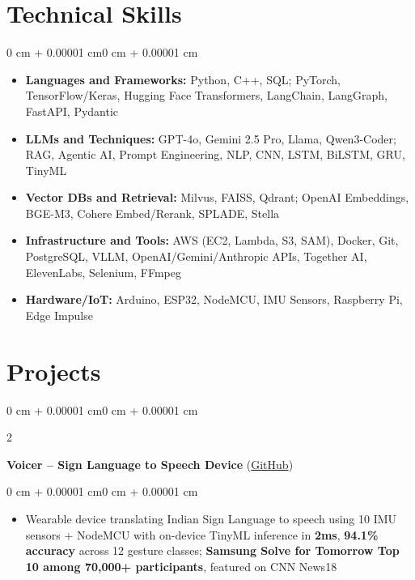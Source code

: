 \documentclass[10pt, letterpaper]{article}
\newenvironment{highlights}{
    \begin{itemize}[
        topsep=0.01 cm,
        parsep=0.01 cm,
        partopsep=0pt,
        itemsep=0pt,
        leftmargin=0 cm + 10pt
    ]
}{
    \end{itemize}
}
\newenvironment{highlightsforbulletentries}{
    \begin{itemize}[
        topsep=0.01 cm,
        parsep=0.01 cm,
        partopsep=0pt,
        itemsep=0pt,
        leftmargin=10pt
    ]
}{
    \end{itemize}
}
\newenvironment{onecolentry}{
    \begin{adjustwidth}{0 cm + 0.00001 cm}{0 cm + 0.00001 cm}
}{
    \end{adjustwidth}
}
\newenvironment{twocolentry}[2][]{
    \onecolentry
    \def\secondColumn{#2}
    \setcolumnwidth{\fill, 5.5 cm}
    \begin{paracol}{2}
}{
    \switchcolumn \raggedleft \secondColumn
    \end{paracol}
    \endonecolentry
}
\let\hrefWithoutArrow\href
\begin{document}
    \section{Technical Skills}

    \begin{onecolentry}
        \begin{highlightsforbulletentries}
            \item \textbf{Languages and Frameworks:} Python, C++, SQL; PyTorch, TensorFlow/Keras, Hugging Face Transformers, LangChain, LangGraph, FastAPI, Pydantic
            \item \textbf{LLMs and Techniques:} GPT-4o, Gemini 2.5 Pro, Llama, Qwen3-Coder; RAG, Agentic AI, Prompt Engineering, NLP, CNN, LSTM, BiLSTM, GRU, TinyML
            \item \textbf{Vector DBs and Retrieval:} Milvus, FAISS, Qdrant; OpenAI Embeddings, BGE-M3, Cohere Embed/Rerank, SPLADE, Stella
            \item \textbf{Infrastructure and Tools:} AWS (EC2, Lambda, S3, SAM), Docker, Git, PostgreSQL, VLLM, OpenAI/Gemini/Anthropic APIs, Together AI, ElevenLabs, Selenium, FFmpeg
            \item \textbf{Hardware/IoT:} Arduino, ESP32, NodeMCU, IMU Sensors, Raspberry Pi, Edge Impulse
        \end{highlightsforbulletentries}
    \end{onecolentry}

    \section{Projects}

        \begin{twocolentry}{
            2023
        }
            \textbf{Voicer -- Sign Language to Speech Device} (\hrefWithoutArrow{https://github.com/amit-gohel/voicer}{GitHub})
        \end{twocolentry}

        \vspace{0.02 cm}
        \begin{onecolentry}
            \begin{highlights}
                \item Wearable device translating Indian Sign Language to speech using 10 IMU sensors + NodeMCU with on-device TinyML inference in \textbf{2ms}, \textbf{94.1\% accuracy} across 12 gesture classes; \textbf{Samsung Solve for Tomorrow Top 10 among 70,000+ participants}, featured on CNN News18
            \end{highlights}
        \end{onecolentry}
\end{document}

